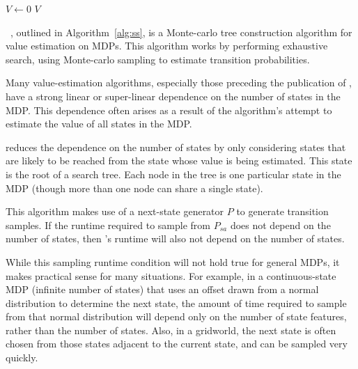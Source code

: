 \begin{algorithm}[tb]
	\caption{$\mbox{Sparse~Sampling~Recursion}(s, P, R, \gamma, d, C)$}
	\label{alg:ssr}
	 {
		$V \leftarrow 0$
	}
	\Return $V$
\end{algorithm}

~\cite{kearns99}, outlined in Algorithm~\ref{alg:ss}, is a Monte-carlo tree construction algorithm for value estimation on MDPs. This algorithm works by performing exhaustive search, using Monte-carlo sampling to estimate transition probabilities.

Many value-estimation algorithms, especially those preceding the publication of , have a strong linear or super-linear dependence on the number of states in the MDP. This dependence often arises as a result of the algorithm's attempt to estimate the value of all states in the MDP.

 reduces the dependence on the number of states by only considering states that are likely to be reached from the state whose value is being estimated. This state is the root of a search tree. Each node in the tree is one particular state in the MDP (though more than one node can share a single state).

This algorithm makes use of a next-state generator $P$ to generate transition samples. If the runtime required to sample from $P_{sa}$ does not depend on the number of states, then 's runtime will also not depend on the number of states.

While this sampling runtime condition will not hold true for general MDPs, it makes practical sense for many situations. For example, in a continuous-state MDP (infinite number of states) that uses an offset drawn from a normal distribution to determine the next state, the amount of time required to sample from that normal distribution will depend only on the number of state features, rather than the number of states. Also, in a gridworld, the next state is often chosen from those states adjacent to the current state, and can be sampled very quickly.

